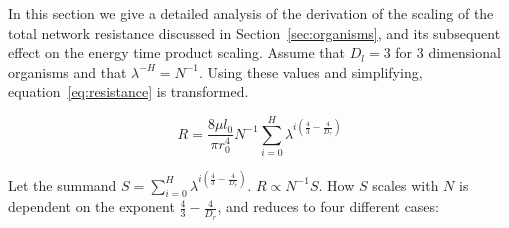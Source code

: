 \documentclass[12pt]{article}
\begin{document}
In this section we give a detailed analysis of the derivation of the scaling
of the total network resistance discussed in Section~\ref{sec:organisms}, and its
subsequent effect on the energy time product scaling. Assume that $D_l = 3$
for $3$ dimensional organisms and that $\lambda^{-H}=N^{-1}$.  Using these
values and simplifying, equation~\ref{eq:resistance} is transformed. 

\begin{equation}
 R = \frac{8 \mu l_0}{\pi r_0^4} N^{-1} \sum_{i=0}^H \lambda^{i(\frac{4}{3} -\frac{4}{D_r})}
\end{equation}

Let the summand $S = \sum_{i=0}^H \lambda^{i(\frac{4}{3} -\frac{4}{D_r})}$. $R \propto
N^{-1} S$. How $S$ scales with $N$ is dependent on the exponent $\frac{4}{3} -
\frac{4}{D_r}$, and reduces to four different cases:
\end{document}
